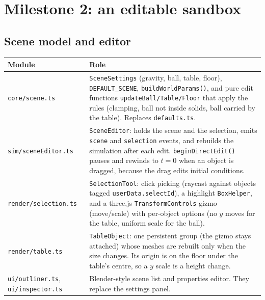 \documentclass[11pt]{article}
\begin{document}
\section{Milestone 2: an editable sandbox}

\subsection{Scene model and editor}
\begin{center}
\begin{tabular}{@{}lp{}@{}}
\toprule
Module & Role \\ \midrule
\texttt{core/scene.ts} & \texttt{SceneSettings} (gravity, ball, table, floor), \texttt{DEFAULT\_SCENE},
  \texttt{buildWorldParams()}, and pure edit functions \texttt{updateBall/Table/Floor} that apply the
  rules (clamping, ball not inside solids, ball carried by the table). Replaces \texttt{defaults.ts}. \\
\texttt{sim/sceneEditor.ts} & \texttt{SceneEditor}: holds the scene and the selection, emits \texttt{scene} and
  \texttt{selection} events, and rebuilds the simulation after each edit. \texttt{beginDirectEdit()} pauses and
  rewinds to $t=0$ when an object is dragged, because the drag edits initial conditions. \\
\texttt{render/selection.ts} & \texttt{SelectionTool}: click picking (raycast against objects tagged
  \texttt{userData.selectId}), a highlight \texttt{BoxHelper}, and a three.js \texttt{TransformControls} gizmo
  (move/scale) with per-object options (no $y$ moves for the table, uniform scale for the ball). \\
\texttt{render/table.ts} & \texttt{TableObject}: one persistent group (the gizmo stays attached) whose meshes are
  rebuilt only when the size changes. Its origin is on the floor under the table's centre, so a $y$ scale is a height change. \\
\texttt{ui/outliner.ts}, \texttt{ui/inspector.ts} & Blender-style scene list and properties editor. They replace the
  settings panel. \\ \bottomrule
\end{tabular}
\end{center}
\end{document}
